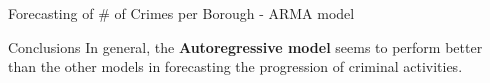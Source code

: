 \documentclass[12pt]{beamer}
\begin{document}
        \begin{frame}{Forecasting of \# of Crimes per Borough - ARMA model}
            \begin{figure}
                \centering
            \end{figure}
        \end{frame}

        \begin{frame}{Conclusions}
            In general, the \textbf{Autoregressive model} seems to perform better than the other models in
            forecasting the progression of criminal activities.
        \end{frame}
\end{document}
